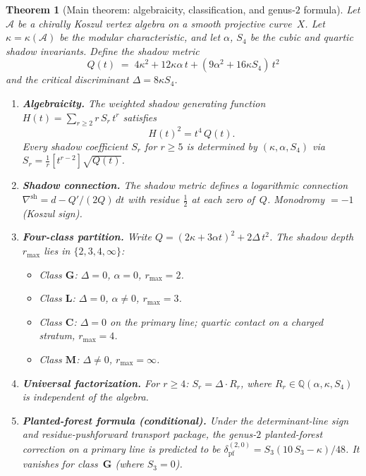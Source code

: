 \documentclass[11pt,reqno]{amsart}
\newtheorem{theorem}{Theorem}[section]
\theoremstyle{definition}
\theoremstyle{remark}
\newcommand{\cA}{\mathcal{A}}
\numberwithin{equation}{section}
\begin{document}
\begin{theorem}[Main theorem: algebraicity, classification,
and genus-$2$ formula]\label{thm:main}
Let\/ $\cA$ be a chirally Koszul vertex algebra on a smooth
projective curve~$X$. Let $\kappa = \kappa(\cA)$ be the modular
characteristic, and let $\alpha$, $S_4$ be the cubic and quartic
shadow invariants.
Define the \emph{shadow metric}
\[
 Q(t)
 \;=\;
 4\kappa^2 + 12\kappa\alpha\,t
 + (9\alpha^2 + 16\kappa S_4)\,t^2
\]
and the \emph{critical discriminant} $\Delta = 8\kappa S_4$.

\begin{enumerate}[label=\textup{(\roman*)}]
\item \textbf{Algebraicity.}
 The weighted shadow generating function
 $H(t) = \sum_{r \ge 2} r\,S_r\,t^r$ satisfies
 \[
 H(t)^2 = t^4\,Q(t).
 \]
 Every shadow coefficient $S_r$ for $r \ge 5$ is determined
 by $(\kappa, \alpha, S_4)$ via
 $S_r = \frac{1}{r}[t^{r-2}]\sqrt{Q(t)}$.

\item \textbf{Shadow connection.}
 The shadow metric defines a logarithmic connection
 $\nabla^{\mathrm{sh}} = d - Q'/(2Q)\,dt$ with residue
 $\frac{1}{2}$ at each zero of~$Q$. Monodromy $= -1$
 \textup{(}Koszul sign\textup{)}.

\item \textbf{Four-class partition.}
 Write $Q = (2\kappa + 3\alpha t)^2 + 2\Delta\,t^2$.
 The shadow depth $r_{\max}$ lies in $\{2, 3, 4, \infty\}$:
 \begin{itemize}
 \item Class $\mathbf{G}$: $\Delta = 0$, $\alpha = 0$,
 $r_{\max} = 2$.
 \item Class $\mathbf{L}$: $\Delta = 0$, $\alpha \ne 0$,
 $r_{\max} = 3$.
 \item Class $\mathbf{C}$: $\Delta = 0$ on the primary line;
 quartic contact on a charged stratum, $r_{\max} = 4$.
 \item Class $\mathbf{M}$: $\Delta \ne 0$, $r_{\max} = \infty$.
 \end{itemize}

\item \textbf{Universal factorization.}
 For $r \ge 4$: $S_r = \Delta \cdot R_r$, where
 $R_r \in \mathbb{Q}(\alpha, \kappa, S_4)$ is independent of
 the algebra.

\item \textbf{Planted-forest formula \textup{(}conditional\textup{)}.}
 Under the determinant-line sign and residue-pushforward transport
 package, the genus-$2$ planted-forest correction on a primary
 line is predicted to be
 $\delta_{\mathrm{pf}}^{(2,0)} = S_3(10\,S_3 - \kappa)/48$.
 It vanishes for class~$\mathbf{G}$ \textup{(}where
 $S_3 = 0$\textup{)}.
\end{enumerate}
\end{theorem}
\end{document}
